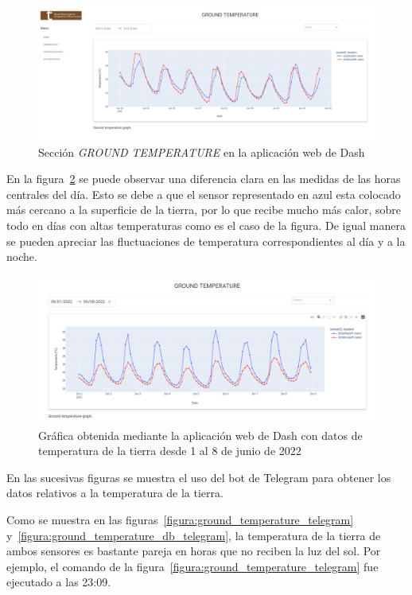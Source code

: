 \documentclass[a4paper, 12pt, oneside]{book}
\begin{document}
\begin{figure}[H]
	\centering
    \includegraphics[width=12cm, keepaspectratio]{img/ground_temperature_dash}
    \caption{Sección \textit{GROUND TEMPERATURE} en la aplicación web de Dash}
    \label{figura:ground_temperature_dash}
\end{figure}


En la figura~\ref{figura:ground_temperature_01_08_junio} se puede observar una diferencia clara en las medidas de las horas centrales del día. Esto se debe a que el sensor representado en azul esta colocado más cercano a la superficie de la tierra, por lo que recibe mucho más calor, sobre todo en días con altas temperaturas como es el caso de la figura. De igual manera se pueden apreciar las fluctuaciones de temperatura correspondientes al día y a la noche.
\begin{figure}[H]
	\centering
    \includegraphics[width=12cm, keepaspectratio]{img/ground_temperature_01_08_junio}
    \caption{Gráfica obtenida mediante la aplicación web de Dash con datos de temperatura de la tierra desde 1 al 8 de junio de 2022}
    \label{figura:ground_temperature_01_08_junio}
\end{figure}

En las sucesivas figuras se muestra el uso del bot de Telegram para obtener los datos relativos a la temperatura de la tierra.

Como se muestra en las figuras~\ref{figura:ground_temperature_telegram} y~\ref{figura:ground_temperature_db_telegram}, la temperatura de la tierra de ambos sensores es bastante pareja en horas que no reciben la luz del sol. Por ejemplo, el comando de la figura~\ref{figura:ground_temperature_telegram} fue ejecutado a las 23:09.
\end{document}

